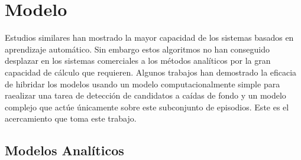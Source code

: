 \documentclass[../tfm.tex]{subfiles}
\begin{document}
\section{Modelo}\label{req_modelos}

Estudios similares han mostrado la mayor capacidad de los sistemas basados en aprendizaje automático. Sin embargo estos algoritmos no han conseguido desplazar en los sistemas comerciales a los métodos analíticos por la gran capacidad de cálculo que requieren. Algunos trabajos han demostrado la eficacia de hibridar los modelos usando un modelo computacionalmente simple para raealizar una tarea de detección de candidatos a caídas de fondo y un modelo complejo que actúe únicamente sobre este subconjunto de episodios. Este es el acercamiento que toma este trabajo.

\subsection{Modelos Analíticos}
\end{document}
